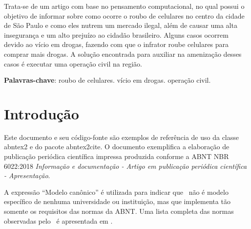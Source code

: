 \documentclass[
	article,			
	11pt,				
	oneside,			
	a4paper,			
	english,			
	brazil,				
	sumario=tradicional
	]{abntex2}
\begin{document}
\frenchspacing 
\maketitle

\begin{resumoumacoluna}
    
    Trata-se de um artigo com base no pensamento computacional, no qual possui o objetivo de 
    informar sobre como ocorre o roubo de celulares no centro da cidade de São Paulo e como
    eles nutrem um mercado ilegal, além de causar uma alta insegurança e um alto prejuízo ao
    cidadão brasileiro. Alguns casos ocorrem devido ao vício em drogas, fazendo com que o
    infrator roube celulares para comprar mais drogas. A solução encontrada para auxiliar na
    amenização desses casos é executar uma operação civil na região.
    
    \vspace{\onelineskip}
    
    \noindent
    \textbf{Palavras-chave}: roubo de celulares. vício em drogas. operação civil.
\end{resumoumacoluna}

\textual

\newpage
\section{Introdução}

Este documento e seu código-fonte são exemplos de referência de uso da classe
\textsf{abntex2} e do pacote \textsf{abntex2cite}. O documento exemplifica a
elaboração de publicação periódica científica impressa produzida conforme a ABNT
NBR 6022:2018 \emph{Informação e documentação - Artigo em publicação periódica
científica - Apresentação}.

A expressão ``Modelo canônico'' é utilizada para indicar que \abnTeX\ não é
modelo específico de nenhuma universidade ou instituição, mas que implementa tão
somente os requisitos das normas da ABNT. Uma lista completa das normas
observadas pelo \abnTeX\ é apresentada em .
\end{document}
